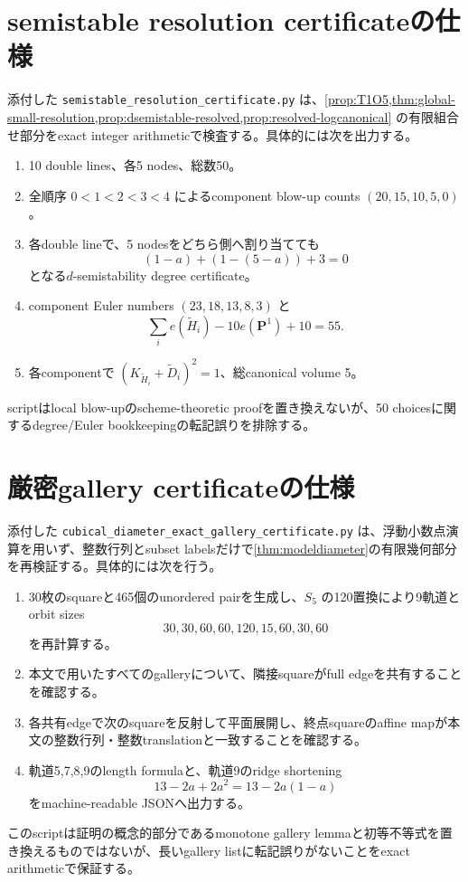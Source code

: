 \documentclass[11pt,a4paper]{ltjsarticle}
\theoremstyle{definition}
\theoremstyle{remark}
\newcommand{\PP}{\mathbf P}
\begin{document}
\section{semistable resolution certificateの仕様}

添付した \texttt{semistable\_resolution\_certificate.py} は、\cref{prop:T1O5,thm:global-small-resolution,prop:dsemistable-resolved,prop:resolved-logcanonical} の有限組合せ部分をexact integer arithmeticで検査する。具体的には次を出力する。
\begin{enumerate}[leftmargin=2.5em]
\item 10 double lines、各5 nodes、総数50。
\item 全順序 $0<1<2<3<4$ によるcomponent blow-up counts $(20,15,10,5,0)$。
\item 各double lineで、5 nodesをどちら側へ割り当てても
\[
 (1-a)+(1-(5-a))+3=0
\]
となる$d$-semistability degree certificate。
\item component Euler numbers $(23,18,13,8,3)$ と
\[
 \sum_i e(\widetilde H_i)-10e(\PP^1)+10=55.
\]
\item 各componentで $(K_{\widetilde H_i}+\widetilde D_i)^2=1$、総canonical volume 5。
\end{enumerate}
scriptはlocal blow-upのscheme-theoretic proofを置き換えないが、50 choicesに関するdegree/Euler bookkeepingの転記誤りを排除する。

\section{厳密gallery certificateの仕様}

添付した \texttt{cubical\_diameter\_exact\_gallery\_certificate.py} は、浮動小数点演算を用いず、整数行列とsubset labelsだけで\cref{thm:modeldiameter}の有限幾何部分を再検証する。具体的には次を行う。
\begin{enumerate}[leftmargin=2.5em]
\item 30枚のsquareと465個のunordered pairを生成し、$S_5$ の120置換により9軌道とorbit sizes
\[
 30,30,60,60,120,15,60,30,60
\]
を再計算する。
\item 本文で用いたすべてのgalleryについて、隣接squareがfull edgeを共有することを確認する。
\item 各共有edgeで次のsquareを反射して平面展開し、終点squareのaffine mapが本文の整数行列・整数translationと一致することを確認する。
\item 軌道5,7,8,9のlength formulaと、軌道9のridge shortening
\[
 13-2a+2a^2=13-2a(1-a)
\]
をmachine-readable JSONへ出力する。
\end{enumerate}
このscriptは証明の概念的部分であるmonotone gallery lemmaと初等不等式を置き換えるものではないが、長いgallery listに転記誤りがないことをexact arithmeticで保証する。
\end{document}
